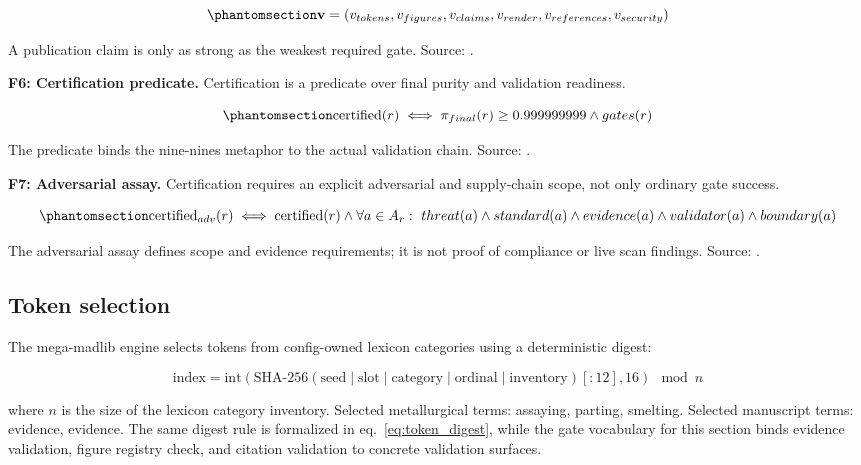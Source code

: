 \documentclass[
]{article}
\begin{document}
\begin{equation}\protect\phantomsection\label{eq:integrity_vector}{
\mathbf{v} = (v_{tokens}, v_{figures}, v_{claims}, v_{render}, v_{references}, v_{security})
}\end{equation}

A publication claim is only as strong as the weakest required gate.
Source: .

\textbf{F6: Certification predicate.} Certification is a predicate over
final purity and validation readiness.

\begin{equation}\protect\phantomsection\label{eq:certification_predicate}{
\operatorname{certified}(r) \iff \pi_{final}(r) \geq 0.999999999 \land gates(r)
}\end{equation}

The predicate binds the nine-nines metaphor to the actual validation
chain. Source:
.

\textbf{F7: Adversarial assay.} Certification requires an explicit
adversarial and supply-chain scope, not only ordinary gate success.

\begin{equation}\protect\phantomsection\label{eq:adversarial_assay}{
\operatorname{certified}_{adv}(r) \iff \operatorname{certified}(r) \land \forall a \in A_r:\ threat(a) \land standard(a) \land evidence(a) \land validator(a) \land boundary(a)
}\end{equation}

The adversarial assay defines scope and evidence requirements; it is not
proof of compliance or live scan findings. Source:
.

\subsection{Token selection}\label{token-selection}

The mega-madlib engine selects tokens from config-owned lexicon
categories using a deterministic digest:

\[
\text{index} = \text{int}\left(\text{SHA-256}\left(\text{seed} \mid \text{slot} \mid \text{category} \mid \text{ordinal} \mid \text{inventory}\right)[:12], 16\right) \mod n
\]

where \(n\) is the size of the lexicon category inventory. Selected
metallurgical terms: assaying, parting, smelting. Selected manuscript
terms: evidence, evidence. The same digest rule is formalized in
eq.~\ref{eq:token_digest}, while the gate vocabulary for this section
binds evidence validation, figure registry check, and citation
validation to concrete validation surfaces.
\end{document}
